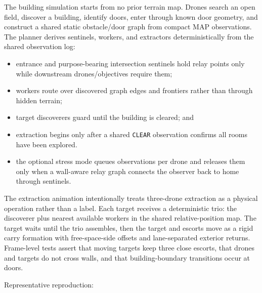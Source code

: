 The building simulation starts from no prior terrain map. Drones search
an open field, discover a building, identify doors, enter through known
door geometry, and construct a shared static obstacle/door graph from
compact MAP observations. The planner derives sentinels, workers, and
extractors deterministically from the shared observation log:

\begin{itemize}
\tightlist
\item
  entrance and purpose-bearing intersection sentinels hold relay points
  only while downstream drones/objectives require them;
\item
  workers route over discovered graph edges and frontiers rather than
  through hidden terrain;
\item
  target discoverers guard until the building is cleared; and
\item
  extraction begins only after a shared \texttt{CLEAR} observation
  confirms all rooms have been explored.
\item
  the optional stress mode queues observations per drone and releases
  them only when a wall-aware relay graph connects the observer back to
  home through sentinels.
\end{itemize}

The extraction animation intentionally treats three-drone extraction as
a physical operation rather than a label. Each target receives a
deterministic trio: the discoverer plus nearest available workers in the
shared relative-position map. The target waits until the trio assembles,
then the target and escorts move as a rigid carry formation with
free-space-side offsets and lane-separated exterior returns. Frame-level
tests assert that moving targets keep three close escorts, that drones
and targets do not cross walls, and that building-boundary transitions
occur at doors.

Representative reproduction:

